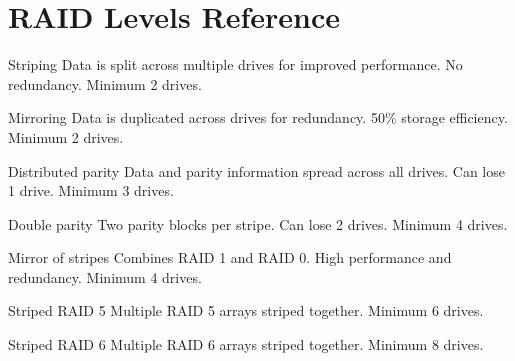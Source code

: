 \documentclass[letterpaper,10pt,english]{sphinxmanual}
\begin{document}
\chapter{RAID Levels Reference}
\label{\detokenize{glossary:raid-levels-reference}}\begin{description}
\sphinxAtStartPar
Striping \sphinxhyphen{} Data is split across multiple drives for improved performance. No redundancy. Minimum 2 drives.

\sphinxAtStartPar
Mirroring \sphinxhyphen{} Data is duplicated across drives for redundancy. 50\% storage efficiency. Minimum 2 drives.

\sphinxAtStartPar
Distributed parity \sphinxhyphen{} Data and parity information spread across all drives. Can lose 1 drive. Minimum 3 drives.

\sphinxAtStartPar
Double parity \sphinxhyphen{} Two parity blocks per stripe. Can lose 2 drives. Minimum 4 drives.

\sphinxAtStartPar
Mirror of stripes \sphinxhyphen{} Combines RAID 1 and RAID 0. High performance and redundancy. Minimum 4 drives.

\sphinxAtStartPar
Striped RAID 5 \sphinxhyphen{} Multiple RAID 5 arrays striped together. Minimum 6 drives.

\sphinxAtStartPar
Striped RAID 6 \sphinxhyphen{} Multiple RAID 6 arrays striped together. Minimum 8 drives.

\end{description}
\end{document}
